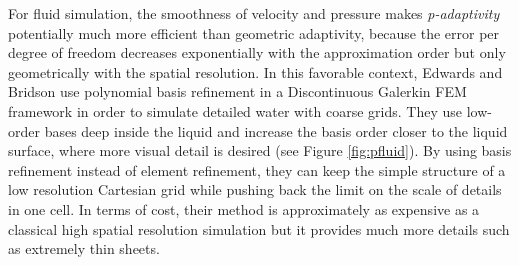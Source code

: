 For fluid simulation, the smoothness of velocity and pressure makes \emph{p-adaptivity} potentially much more efficient than geometric adaptivity, because the error per degree of freedom decreases exponentially with the approximation order but only geometrically with the spatial resolution. In this favorable context, Edwards and Bridson \cite{Edwards2012,Edwards2014} use polynomial basis refinement in a Discontinuous Galerkin FEM framework in order to simulate detailed water with coarse grids. They use low-order bases deep inside the liquid and increase the basis order closer to the liquid surface, where more visual detail is desired (see Figure \ref{fig:pfluid}). By using basis refinement instead of element refinement, they can keep the simple structure of a low resolution Cartesian grid while pushing back the limit on the scale of details in one cell. In terms of cost, their method is approximately as expensive as a classical high spatial resolution simulation but it provides much more details such as extremely thin sheets.
